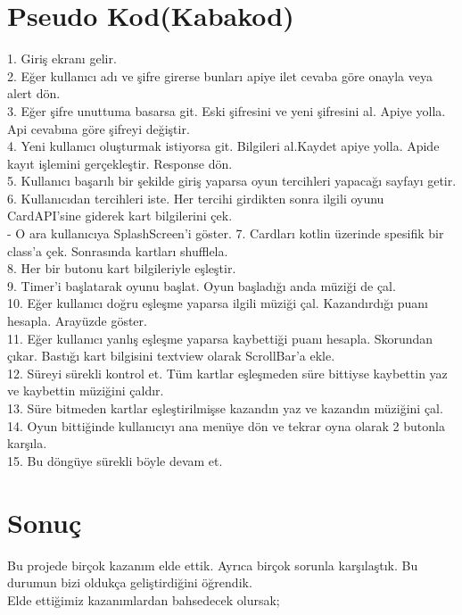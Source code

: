 \documentclass[conference]{IEEEtran}
\begin{document}
\section{Pseudo Kod(Kabakod)}

1. Giriş ekranı gelir.\\
2. Eğer kullanıcı adı ve şifre girerse bunları apiye ilet cevaba göre onayla veya alert dön.\\
3. Eğer şifre unuttuma basarsa git. Eski şifresini ve yeni şifresini al. Apiye yolla. Api cevabına göre şifreyi değiştir.\\
4. Yeni kullanıcı oluşturmak istiyorsa git. Bilgileri al.Kaydet apiye yolla. Apide kayıt işlemini gerçekleştir. Response dön.\\
5. Kullanıcı başarılı bir şekilde giriş yaparsa oyun tercihleri yapacağı sayfayı getir.\\
6. Kullanıcıdan tercihleri iste. Her tercihi girdikten sonra ilgili oyunu CardAPI'sine giderek kart bilgilerini çek.\\
- O ara kullanıcıya SplashScreen'i göster.
7. Cardları kotlin üzerinde spesifik bir class'a çek. Sonrasında kartları shufflela.\\
8. Her bir butonu kart bilgileriyle eşleştir.\\
9. Timer'i başlatarak oyunu başlat. Oyun başladığı anda müziği de çal.\\
10. Eğer kullanıcı doğru eşleşme yaparsa ilgili müziği çal. Kazandırdığı puanı hesapla. Arayüzde göster.\\
11. Eğer kullanıcı yanlış eşleşme yaparsa kaybettiği puanı hesapla. Skorundan çıkar. Bastığı kart bilgisini textview olarak ScrollBar'a ekle.\\ 
12. Süreyi sürekli kontrol et. Tüm kartlar eşleşmeden süre bittiyse kaybettin yaz ve kaybettin müziğini çaldır.\\
13. Süre bitmeden kartlar eşleştirilmişse kazandın yaz ve kazandın müziğini çal.\\
14. Oyun bittiğinde kullanıcıyı ana menüye dön ve tekrar oyna olarak 2 butonla karşıla.\\
15. Bu döngüye sürekli böyle devam et.\\    






\section{Sonuç}

Bu projede birçok kazanım elde ettik. Ayrıca birçok sorunla karşılaştık. Bu durumun bizi oldukça geliştirdiğini öğrendik.\\
Elde ettiğimiz kazanımlardan bahsedecek olursak;\\
\end{document}
